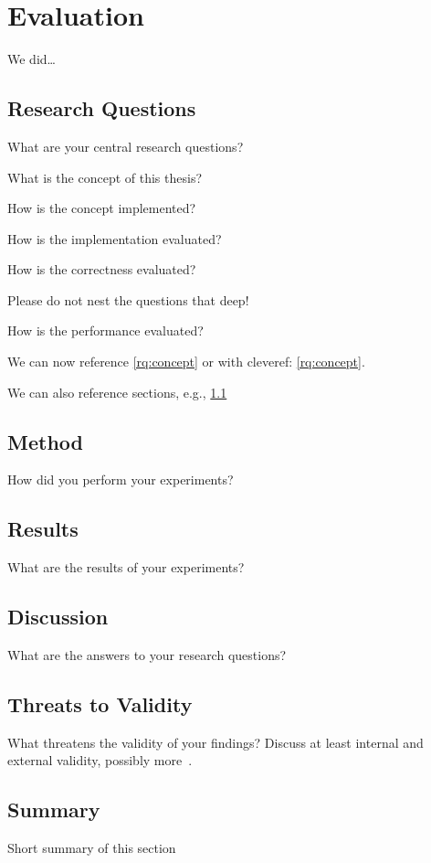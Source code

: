 \setchaptertoc
\chapter{Evaluation}\label{chp:evaluation}

\begin{summary}
We did\ldots
\end{summary}

\section[RQs]{Research Questions}\label{sec:evaluation:rqs}
What are your central research questions?

\begin{rqs}
    \item \label{rq:concept} What is the concept of this thesis?
    \item \label{rq:implementation} How is the concept implemented?
    \item \label{rq:evaluation} How is the implementation evaluated?
    \begin{rqs}
        \item \label{rq:evaluation:correctness} How is the correctness evaluated? \begin{rqs}
                                                                                      \item Please do not nest the questions that deep!
        \end{rqs}
        \item \label{rq:evaluation:performance} How is the performance evaluated?
    \end{rqs}
\end{rqs}

We can now reference \ref{rq:concept} or with cleveref: \cref{rq:concept}.

We can also reference sections, e.g., \cref{sec:evaluation:rqs}

\section{Method}
How did you perform your experiments?

\section{Results}
What are the results of your experiments?

\section{Discussion}
What are the answers to your research questions?

\section[Threats]{Threats to Validity}
What threatens the validity of your findings?
Discuss at least internal and external validity, possibly more~\cite{WRH+12}.

\section{Summary}
Short summary of this section